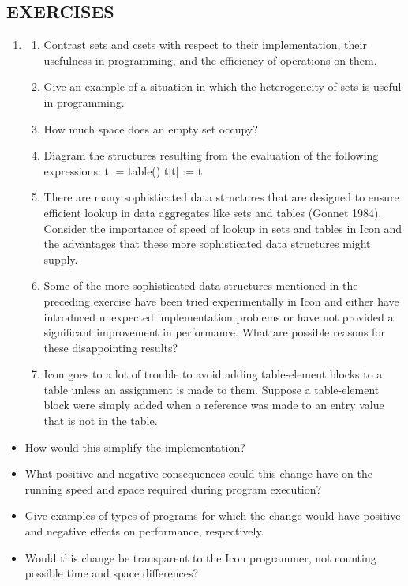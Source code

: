 \subsection{EXERCISES}
\liststyleLvii
\begin{enumerate}
\item \begin{enumerate}

\item Contrast sets and csets with respect to their implementation,
their usefulness in programming, and the efficiency of operations on
them.

\item Give an example of a situation in which the heterogeneity of
sets is useful in programming.

\item How much space does an empty set occupy?

\item Diagram the structures resulting from the evaluation of the
following expressions:\newline
 t := table()\newline
 t[t] := t

\item There are many sophisticated data structures that are designed
to ensure efficient lookup in data aggregates like sets and tables
(Gonnet 1984). Consider the importance of speed of lookup in sets and
tables in Icon and the advantages that these more sophisticated data
structures might supply.

\item Some of the more sophisticated data structures mentioned in the
preceding exercise have been tried experimentally in Icon and either
have introduced unexpected implementation problems or have not
provided a significant improvement in performance. What are possible
reasons for these disappointing results?

\item Icon goes to a lot of trouble to avoid adding table-element
blocks to a table unless an assignment is made to them.  Suppose a
table-element block were simply added when a reference was made to an
entry value that is not in the table.
\end{enumerate}
\end{enumerate}
\liststyleLviii
\begin{itemize}
\item How would this simplify the implementation?

\item What positive and negative consequences could this change have
on the running speed and space required during program execution?

\item Give examples of types of programs for which the change would
have positive and negative effects on performance, respectively.

\item Would this change be transparent to the Icon programmer, not
counting possible time and space differences?
\end{itemize}
